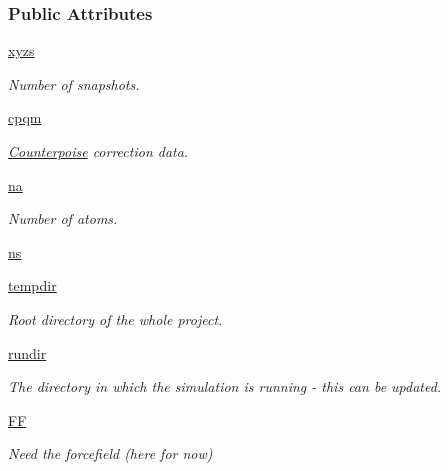 \subsubsection*{\-Public \-Attributes}
\begin{DoxyCompactItemize}
\item 
\hyperlink{classforcebalance_1_1counterpoise_1_1Counterpoise_a1f1d1dea143c1e48971834d1c59ea1af}{xyzs}
\begin{DoxyCompactList}\small\item\em \-Number of snapshots. \end{DoxyCompactList}\item 
\hyperlink{classforcebalance_1_1counterpoise_1_1Counterpoise_ae7622f5b81661b6c993fb1eae9b5a2dd}{cpqm}
\begin{DoxyCompactList}\small\item\em \hyperlink{classforcebalance_1_1counterpoise_1_1Counterpoise}{\-Counterpoise} correction data. \end{DoxyCompactList}\item 
\hyperlink{classforcebalance_1_1counterpoise_1_1Counterpoise_a9c71035de6655db49d73dc1bab527364}{na}
\begin{DoxyCompactList}\small\item\em \-Number of atoms. \end{DoxyCompactList}\item 
\hyperlink{classforcebalance_1_1counterpoise_1_1Counterpoise_a1622645ee4872a0992c2ba1aacfd5c83}{ns}
\item 
\hyperlink{classforcebalance_1_1target_1_1Target_aede2856573b890cd47054ad36937d6f6}{tempdir}
\begin{DoxyCompactList}\small\item\em \-Root directory of the whole project. \end{DoxyCompactList}\item 
\hyperlink{classforcebalance_1_1target_1_1Target_a1da470037ef61c22dc44beb85cfa01a9}{rundir}
\begin{DoxyCompactList}\small\item\em \-The directory in which the simulation is running -\/ this can be updated. \end{DoxyCompactList}\item 
\hyperlink{classforcebalance_1_1target_1_1Target_a796dc30a19a60c63fb43b088d40a963f}{\-F\-F}
\begin{DoxyCompactList}\small\item\em \-Need the forcefield (here for now) \end{DoxyCompactList}\item 

\end{DoxyCompactItemize}
